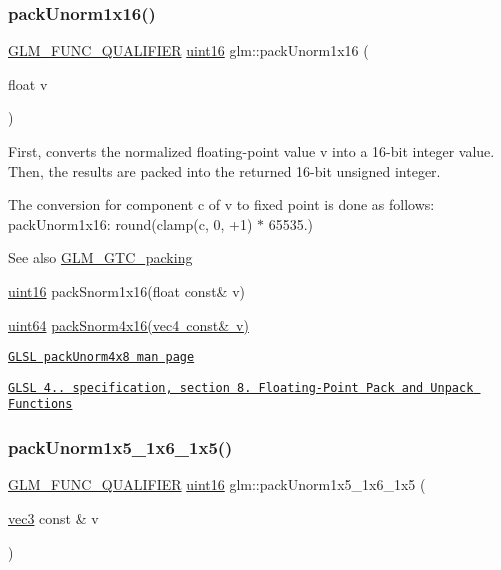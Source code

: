 \subsubsection{\texorpdfstring{pack\+Unorm1x16()}{packUnorm1x16()}}
{\footnotesize\ttfamily \mbox{\hyperlink{setup_8hpp_a33fdea6f91c5f834105f7415e2a64407}{G\+L\+M\+\_\+\+F\+U\+N\+C\+\_\+\+Q\+U\+A\+L\+I\+F\+I\+ER}} \mbox{\hyperlink{group__gtc__type__precision_gad8c2939e1fdd8e5828b31d95c52255d5}{uint16}} glm\+::pack\+Unorm1x16 (\begin{DoxyParamCaption}\item[{float}]{v }\end{DoxyParamCaption})}

First, converts the normalized floating-\/point value v into a 16-\/bit integer value. Then, the results are packed into the returned 16-\/bit unsigned integer.

The conversion for component c of v to fixed point is done as follows\+: pack\+Unorm1x16\+: round(clamp(c, 0, +1) $\ast$ 65535.)

\begin{DoxySeeAlso}{See also}
\mbox{\hyperlink{group__gtc__packing}{G\+L\+M\+\_\+\+G\+T\+C\+\_\+packing}} 

\mbox{\hyperlink{group__gtc__type__precision_gad8c2939e1fdd8e5828b31d95c52255d5}{uint16}} pack\+Snorm1x16(float const\& v) 

\mbox{\hyperlink{group__gtc__type__precision_gae3632bf9b37da66233d78930dd06378a}{uint64}} \mbox{\hyperlink{group__gtc__packing_ga9b237d7c66b7a71964e6d1f4dc06539f}{pack\+Snorm4x16(vec4 const\& v)}} 

\href{http://www.opengl.org/sdk/docs/manglsl/xhtml/packUnorm4x8.xml}{\tt G\+L\+SL pack\+Unorm4x8 man page} 

\href{http://www.opengl.org/registry/doc/GLSLangSpec.4.20.8.pdf}{\tt G\+L\+SL 4.. specification, section 8. Floating-\/\+Point Pack and Unpack Functions} 
\end{DoxySeeAlso}
\mbox{\label{group__gtc__packing_ga0fcb493167d540aca105d11df5c55503}} 
\subsubsection{\texorpdfstring{pack\+Unorm1x5\+\_\+1x6\+\_\+1x5()}{packUnorm1x5\_1x6\_1x5()}}
{\footnotesize\ttfamily \mbox{\hyperlink{setup_8hpp_a33fdea6f91c5f834105f7415e2a64407}{G\+L\+M\+\_\+\+F\+U\+N\+C\+\_\+\+Q\+U\+A\+L\+I\+F\+I\+ER}} \mbox{\hyperlink{group__gtc__type__precision_gad8c2939e1fdd8e5828b31d95c52255d5}{uint16}} glm\+::pack\+Unorm1x5\+\_\+1x6\+\_\+1x5 (\begin{DoxyParamCaption}\item[{\mbox{\hyperlink{group__core__types_ga1c47e8b3386109bc992b6c48e91b0be7}{vec3}} const \&}]{v }\end{DoxyParamCaption})}

